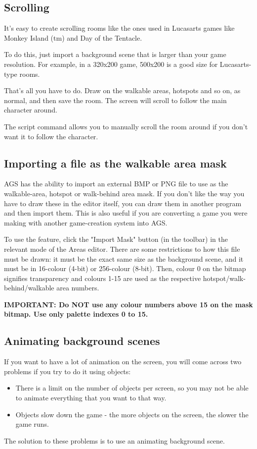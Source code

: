 \subsection{Scrolling}%

It's easy to create scrolling rooms like the ones used in Lucasarts games
like Monkey Island (tm) and Day of the Tentacle.

To do this, just import a background scene that is larger than your game resolution.
For example, in a 320x200 game, 500x200 is a good size for Lucasarts-type rooms.

That's all you have to do. Draw on the walkable areas, hotspots and so on, as
normal, and then save the room. The screen will scroll to follow the main character
around.

The script command  allows you to manually scroll
the room around if you don't want it to follow the character.


\subsection{Importing a file as the walkable area mask}%

AGS has the ability to import an external BMP or PNG file to use as the
walkable-area, hotspot or walk-behind area mask. If you don't like the way
you have to draw these in the editor itself, you can draw them in another
program and then import them. This is also useful if you are converting a
game you were making with another game-creation system into AGS.

To use the feature, click the "Import Mask" button (in the toolbar) in the
relevant mode of the Areas editor. There are some restrictions to how this
file must be drawn: it must be the exact same size as the background scene,
and it must be in 16-colour (4-bit) or 256-colour (8-bit). Then, colour 0
on the bitmap signifies transparency and colours 1-15 are used as the
respective hotspot/walk-behind/walkable area numbers.

\bf{IMPORTANT:} Do NOT use any colour numbers above 15 on the mask bitmap. Use only
palette indexes 0 to 15.


\subsection{Animating background scenes}%

If you want to have a lot of animation on the screen, you will come across
two problems if you try to do it using objects:
\begin{itemize}
\item There is a limit on the number of objects per screen, so you may not be able to
animate everything that you want to that way.
\item Objects slow down the game - the more objects on the screen, the slower
the game runs.
\end{itemize}
The solution to these problems is to use an animating background scene.

